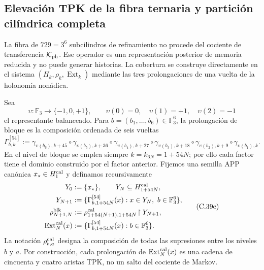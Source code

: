 \subsection{Elevación TPK de la fibra ternaria y partición cilíndrica completa}
\label{subsec:elevacion-catalogal-ch}

La fibra de \(729=3^6\) subcilindros de refinamiento no procede del cociente de transferencia
\(\mathcal K_{\rm ph}\). Ese operador es una representación posterior de memoria
reducida y no puede generar historias. La cobertura se construye directamente
en el sistema \((H_k,\rho_k,\operatorname{Ext}_k)\) mediante las tres
prolongaciones de una vuelta de la holonomía nonádica.





Sea
\[
 \upsilon:\mathbb F_3\longrightarrow\{-1,0,+1\},\qquad
 \upsilon(0)=0,\quad\upsilon(1)=+1,\quad\upsilon(2)=-1
\]
el representante balanceado. Para
\(b=(b_1,\ldots,b_6)\in\mathbb F_3^6\), la prolongación de bloque es la
composición ordenada de seis vueltas
\[
 \Gamma_{b,k}^{[54]}:=
 \gamma_{\upsilon(b_6),k+45}\circ\gamma_{\upsilon(b_5),k+36}\circ
 \gamma_{\upsilon(b_4),k+27}\circ\gamma_{\upsilon(b_3),k+18}\circ
 \gamma_{\upsilon(b_2),k+9}\circ\gamma_{\upsilon(b_1),k}.
\tag{C.39d}
\label{eq:gamma-bloque-54-ch}
\]
En el nivel de bloque se emplea siempre
\(k=k_{6N}=1+54N\); por ello cada factor tiene el dominio construido por el
factor anterior.
Fijemos una semilla APP canónica \(x_\star\in H^{\rm cal}_1\) y definamos
recursivamente
\[
 \begin{aligned}
  Y_0&:=\{x_\star\},\qquad Y_N\subseteq H_{1+54N}^{\rm cal},\\
  Y_{N+1}&:=\{\Gamma_{b,1+54N}^{[54]}(x):
                 x\in Y_N,\ b\in\mathbb F_3^6\},\\
  \rho^{\rm blk}_{N+1,N}
    &:=\rho^{\rm cal}_{1+54(N+1),1+54N}
       \!\upharpoonright Y_{N+1},\\
  \operatorname{Ext}^{\rm cal}_N(x)
    &:=\{\Gamma_{b,1+54N}^{[54]}(x):b\in\mathbb F_3^6\}.
 \end{aligned}
\tag{C.39e}
\label{eq:sincronizacion-54-ch}
\]
La notación \(\rho^{\rm cal}_{b,a}\) designa la composición de todas las supresiones
entre los niveles \(b\) y \(a\). Por construcción, cada prolongación de
\(\operatorname{Ext}^{\rm cal}_N(x)\) es una cadena de cincuenta y cuatro
aristas TPK, no un salto del cociente de Markov.

